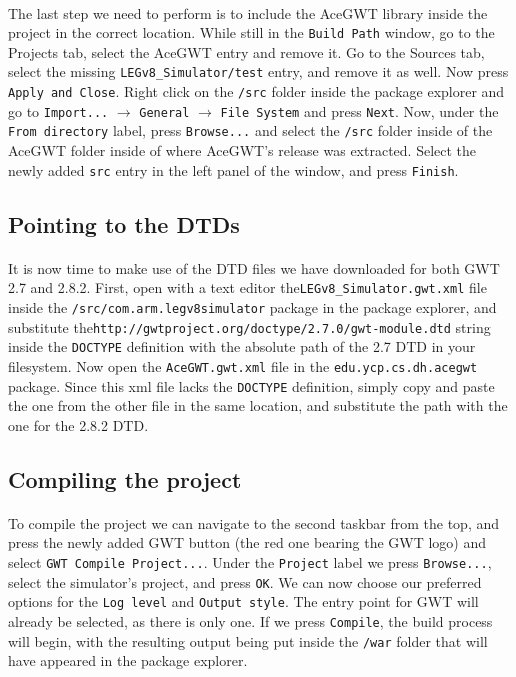 \paragraph{}
The last step we need to perform is to include the AceGWT library inside the project in the correct location. While still in the \verb|Build Path| window, go to the Projects tab, select the AceGWT entry and remove it. Go to the Sources tab, select the missing \verb|LEGv8_Simulator/test| entry, and remove it as well. Now press \verb|Apply and Close|. Right click on the \verb|/src| folder inside the package explorer and go to \verb|Import...| $\longrightarrow$ \verb|General| $\longrightarrow$ \verb|File System| and press \verb|Next|. Now, under the \verb|From directory| label, press \verb|Browse...| and select the \verb|/src| folder inside of the AceGWT folder inside of where AceGWT's release was extracted. Select the newly added  \verb|src| entry in the left panel of the window, and press \verb|Finish|.
\subsection{Pointing to the DTDs}
\paragraph{}
It is now time to make use of the DTD files we have downloaded for both GWT 2.7 and 2.8.2. First, open with a text editor the\newline \verb|LEGv8_Simulator.gwt.xml| file inside the \verb|/src/com.arm.legv8simulator| package in the package explorer, and substitute the\newline \verb|http://gwtproject.org/doctype/2.7.0/gwt-module.dtd| string inside the \verb|DOCTYPE| definition with the absolute path of the 2.7 DTD in your filesystem. Now open the \verb|AceGWT.gwt.xml| file in the \verb|edu.ycp.cs.dh.acegwt| package. Since this xml file lacks the \verb|DOCTYPE| definition, simply copy and paste the one from the other file in the same location, and substitute the path with the one for the 2.8.2 DTD.
\subsection{Compiling the project}
\paragraph{}
To compile the project we can navigate to the second taskbar from the top, and press the newly added GWT button (the red one bearing the GWT logo) and select \verb|GWT Compile Project...|. Under the \verb|Project| label we press \verb|Browse...|, select the simulator's project, and press \verb|OK|. We can now choose our preferred options for the \verb|Log level| and \verb|Output style|. The entry point for GWT will already be selected, as there is only one. If we press \verb|Compile|, the build process will begin, with the resulting output being put inside the \verb|/war| folder that will have appeared in the package explorer.
